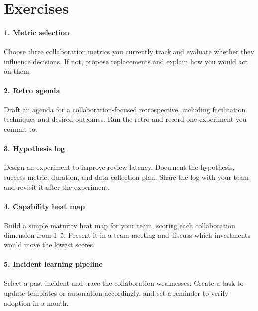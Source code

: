 \section*{Exercises}

\paragraph{1. Metric selection} Choose three collaboration metrics you currently track and evaluate whether they influence decisions. If not, propose replacements and explain how you would act on them.

\paragraph{2. Retro agenda} Draft an agenda for a collaboration-focused retrospective, including facilitation techniques and desired outcomes. Run the retro and record one experiment you commit to.

\paragraph{3. Hypothesis log} Design an experiment to improve review latency. Document the hypothesis, success metric, duration, and data collection plan. Share the log with your team and revisit it after the experiment.

\paragraph{4. Capability heat map} Build a simple maturity heat map for your team, scoring each collaboration dimension from 1--5. Present it in a team meeting and discuss which investments would move the lowest scores.

\paragraph{5. Incident learning pipeline} Select a past incident and trace the collaboration weaknesses. Create a task to update templates or automation accordingly, and set a reminder to verify adoption in a month.
